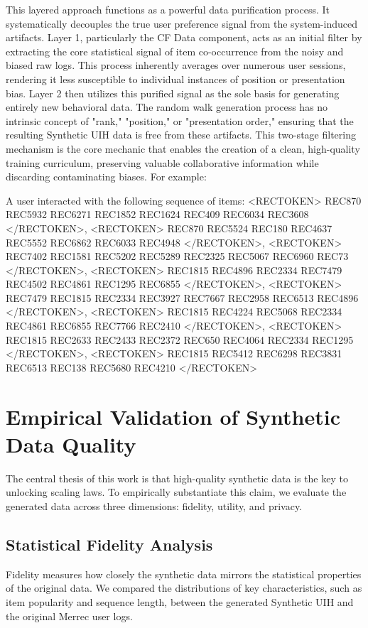 \documentclass[]{fairmeta}
\begin{document}
This layered approach functions as a powerful data purification process. It systematically decouples the true user preference signal from the system-induced artifacts. Layer 1, particularly the CF Data component, acts as an initial filter by extracting the core statistical signal of item co-occurrence from the noisy and biased raw logs. This process inherently averages over numerous user sessions, rendering it less susceptible to individual instances of position or presentation bias. Layer 2 then utilizes this purified signal as the sole basis for generating entirely new behavioral data. The random walk generation process has no intrinsic concept of "rank," "position," or "presentation order," ensuring that the resulting Synthetic UIH data is free from these artifacts. This two-stage filtering mechanism is the core mechanic that enables the creation of a clean, high-quality training curriculum, preserving valuable collaborative information while discarding contaminating biases. For example:
\begin{boxA}
A user interacted with the following sequence of items: 
<RECTOKEN> REC870 REC5932 REC6271 REC1852 REC1624 REC409 REC6034 REC3608 </RECTOKEN>, 
<RECTOKEN> REC870 REC5524 REC180 REC4637 REC5552 REC6862 REC6033 REC4948 </RECTOKEN>, 
<RECTOKEN> REC7402 REC1581 REC5202 REC5289 REC2325 REC5067 REC6960 REC73 </RECTOKEN>, 
<RECTOKEN> REC1815 REC4896 REC2334 REC7479 REC4502 REC4861 REC1295 REC6855 </RECTOKEN>, 
<RECTOKEN> REC7479 REC1815 REC2334 REC3927 REC7667 REC2958 REC6513 REC4896 </RECTOKEN>, 
<RECTOKEN> REC1815 REC4224 REC5068 REC2334 REC4861 REC6855 REC7766 REC2410 </RECTOKEN>, 
<RECTOKEN> REC1815 REC2633 REC2433 REC2372 REC650 REC4064 REC2334 REC1295 </RECTOKEN>, 
<RECTOKEN> REC1815 REC5412 REC6298 REC3831 REC6513 REC138 REC5680 REC4210 </RECTOKEN>
\end{boxA}
\section{Empirical Validation of Synthetic Data Quality}
The central thesis of this work is that high-quality synthetic data is the key to unlocking scaling laws. To empirically substantiate this claim, we evaluate the generated data across three dimensions: fidelity, utility, and privacy.
\subsection{Statistical Fidelity Analysis}
Fidelity measures how closely the synthetic data mirrors the statistical properties of the original data. We compared the distributions of key characteristics, such as item popularity and sequence length, between the generated Synthetic UIH and the original Merrec user logs.
\end{document}
